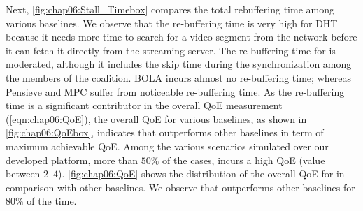 Next, \fig\ref{fig:chap06:Stall_Timebox} compares the total rebuffering time among various baselines. We observe that the re-buffering time is very high for \ac{DHT} because it needs more time to search for a video segment from the network before it can fetch it directly from the streaming server. The re-buffering time for {\our} is moderated, although it includes the skip time during the synchronization among the members of the coalition. BOLA incurs almost no re-buffering time; whereas Pensieve and MPC suffer from noticeable re-buffering time. As the re-buffering time is a significant contributor in the overall \ac{QoE} measurement (\eqn\ref{eqn:chap06:QoE}), the overall \ac{QoE} for various baselines, as shown in \fig\ref{fig:chap06:QoEbox}, indicates that {\our} outperforms other baselines in term of maximum achievable \ac{QoE}.  Among the various scenarios simulated over our developed platform, more than $50\%$ of the cases, {\our} incurs a high \ac{QoE} (value between $2$--$4$). \fig\ref{fig:chap06:QoE} shows the distribution of the overall \ac{QoE} for {\our} in comparison with other baselines. We observe that {\our} outperforms other baselines for $80\%$ of the time.



